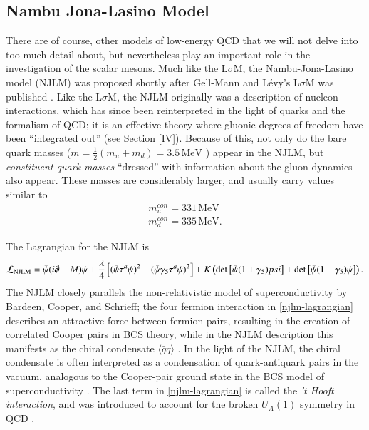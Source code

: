 \documentclass[aps,prd,onecolumn,showpacs,amsmath,amssymb,nofootinbib]{revtex4} \pdfoutput=1
\newcommand{\lsm}{L$\sigma$M}
\newcommand{\mev}{\mathrm{MeV}}
\begin{document}
\subsection{Nambu Jona-Lasino Model}
There are of course, other models of low-energy QCD that we will not delve into too much detail about, but nevertheless play an important role in the investigation of the scalar mesons. Much like the \lsm, the Nambu-Jona-Lasino model (NJLM) was proposed shortly after Gell-Mann and L\'evy's {\lsm} was published \cite{NJL1, NJL2}. Like the {\lsm}, the NJLM originally was a description of nucleon interactions, which has since been reinterpreted in the light of quarks and the formalism of QCD; it is an effective theory where gluonic degrees of freedom have been ``integrated out'' (see Section \ref{IV}). Because of this, not only do the bare quark masses ($\bar{m} = \frac{1}{2}(m_u + m_d) = 3.5\,\mev$ \cite{PDG2018}) appear in the NJLM, but \textit{constituent quark masses} ``dressed'' with information about the gluon dynamics also appear. These masses are considerably larger, and usually carry values similar to \cite{Schumacher2014}
\begin{gather}
    \label{constituent-quark-masses}
    m_u^{con} = 331\,\mev\\
    m_d^{con} = 335\,\mev.
\end{gather}

The Lagrangian for the NJLM is
\begin{equation}
    \label{njlm-lagrangian}
    \mathcal{L}_{\mathrm{NJLM}} = \bar{\psi}(i\slashed{\partial}-M)\psi + \frac{\lambda}{4}\left[ (\bar{\psi}\tau^{a}\psi)^{2}-(\bar{\psi}\gamma_{5}\tau^{a}\psi)^{2}\right] + K \left(\mathrm{det}\left[ \bar{\psi}(1+\gamma_5)psi\right] + \mathrm{det}\left[\bar{\psi}(1-\gamma_5)\psi\right]\right).
\end{equation}
The NJLM closely parallels the non-relativistic model of superconductivity by Bardeen, Cooper, and Schrieff; the four fermion interaction in \eqref{njlm-lagrangian} describes an attractive force between fermion pairs,  resulting in the creation of correlated Cooper pairs in BCS theory, while in the NJLM description this manifests as the chiral condensate $\langle \bar{q} q \rangle$ \cite{Hatsuda1994}. In the light of the NJLM, the chiral condensate is often interpreted as a condensation of quark-antiquark pairs in the vacuum, analogous to the Cooper-pair ground state in the BCS model of superconductivity \cite{Hatsuda1994}. The last term in \eqref{njlm-lagrangian} is called the \textit{'t Hooft interaction}, and was introduced to account for the broken $U_{A}(1)$ symmetry in QCD \cite{meissner1988nambu}.
\end{document}
